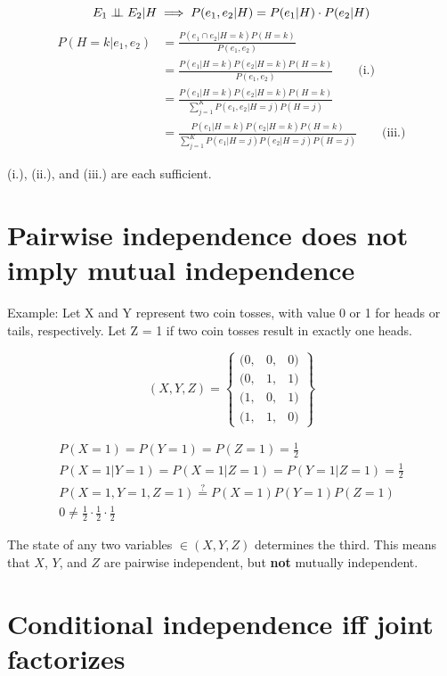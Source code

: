 \documentclass{article}
\begin{document}
\begin{equation*}
  E_1 \perp\!\!\!\perp E_2 | H \implies P(e_1,e_2|H) = P(e_1|H) \cdot P(e_2|H)
\end{equation*}
\begin{align*}
    P(H=k|e_1,e_2) &= \frac{P(e_1 \cap e_2|H=k)P(H=k)}{P(e_1,e_2)} \\
    &= \frac{P(e_1|H=k)P(e_2|H=k)P(H=k)}{P(e_1,e_2)} \qquad
    \text{(i.)} \\
    &= \frac{P(e_1|H=k)P(e_2|H=k)P(H=k)}{\sum\limits_{j=1}^K
      P(e_1,e_2|H=j)P(H=j)} \\
    &= \frac{P(e_1|H=k)P(e_2|H=k)P(H=k)}{\sum\limits_{j=1}^K
      P(e_1|H=j)P(e_2|H=j)P(H=j)} \qquad \text{(iii.)}
\end{align*}

(i.), (ii.), and (iii.) are each sufficient.

\section{Pairwise independence does not imply mutual independence}

Example: Let X and Y represent two coin tosses, with value 0 or 1 for
heads or tails, respectively. Let Z = 1 if two coin tosses result in
exactly one heads.

\[ (X, Y, Z) = \left\{
  \begin{array}{ccc}
    ( 0, & 0, & 0 ) \\
    (0, & 1, & 1) \\
    (1, & 0, & 1) \\ 
    (1, & 1, & 0)
  \end{array}
\right\}
\]

\begin{gather*}
  P(X=1) = P(Y=1) = P(Z=1) = \frac{1}{2} \\
  P(X=1|Y=1) = P(X=1|Z=1) = P(Y=1|Z=1) = \frac{1}{2} \\
  P(X=1,Y=1,Z=1) \stackrel{?}{=} P(X=1)P(Y=1)P(Z=1) \\
  0 \neq \frac{1}{2} \cdot \frac{1}{2} \cdot \frac{1}{2}
\end{gather*}

The state of any two variables $\in (X, Y, Z)$ determines the third.
This means that $X$, $Y$, and $Z$ are pairwise independent, but
\textbf{not} mutually independent.

\section{Conditional independence iff joint factorizes}
\end{document}
